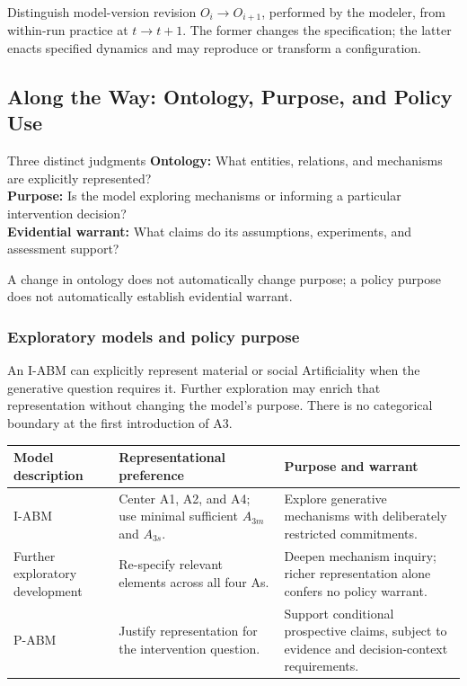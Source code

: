 \documentclass[11pt,a4paper]{article}
\begin{document}
Distinguish model-version revision $O_i\to O_{i+1}$, performed by the modeler, from within-run practice at $t\to t+1$. The former changes the specification; the latter enacts specified dynamics and may reproduce or transform a configuration.



\subsection{Along the Way: Ontology, Purpose, and Policy Use}

\begin{principle}{Three distinct judgments}
\textbf{Ontology:} What entities, relations, and mechanisms are explicitly represented?\\
\textbf{Purpose:} Is the model exploring mechanisms or informing a particular intervention decision?\\
\textbf{Evidential warrant:} What claims do its assumptions, experiments, and assessment support?

A change in ontology does not automatically change purpose; a policy purpose does not automatically establish evidential warrant.
\end{principle}

\subsubsection{Exploratory models and policy purpose}
An I-ABM can explicitly represent material or social Artificiality when the generative question requires it. Further exploration may enrich that representation without changing the model's purpose. There is no categorical boundary at the first introduction of A3.

\noindent\begin{tabularx}{\linewidth}{@{}p{3.4cm}YY@{}}
\toprule
\textbf{Model description} & \textbf{Representational preference} & \textbf{Purpose and warrant}\\\midrule
I-ABM & Center A1, A2, and A4; use minimal sufficient $A_{3m}$ and $A_{3s}$. & Explore generative mechanisms with deliberately restricted commitments.\\
Further exploratory development & Re-specify relevant elements across all four As. & Deepen mechanism inquiry; richer representation alone confers no policy warrant.\\
P-ABM & Justify representation for the intervention question. & Support conditional prospective claims, subject to evidence and decision-context requirements.\\\bottomrule
\end{tabularx}
\end{document}
